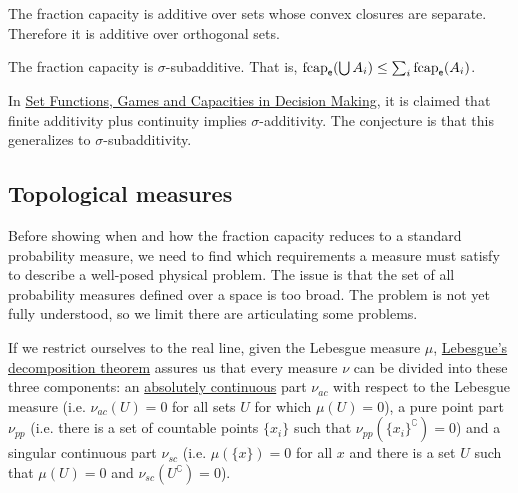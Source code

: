 \begin{conj}
	The fraction capacity is additive over sets whose convex closures are separate. Therefore it is additive over orthogonal sets.
\end{conj}

\begin{conj}
	The fraction capacity is $\sigma$-subadditive. That is, $\mathrm{fcap}_{\mathsf{e}}(\bigcup A_i) \leq \sum_i \mathrm{fcap}_{\mathsf{e}}(A_i)$.
\end{conj}

\begin{remark}
	In \href{https://link.springer.com/book/10.1007/978-3-319-30690-2}{Set Functions, Games and Capacities in Decision Making}, it is claimed that finite additivity plus continuity implies $\sigma$-additivity. The conjecture is that this generalizes to $\sigma$-subadditivity.
\end{remark}

\subsection{Topological measures}

Before showing when and how the fraction capacity reduces to a standard probability measure, we need to find which requirements a measure must satisfy to describe a well-posed physical problem. The issue is that the set of all probability measures defined over a space is too broad. The problem is not yet fully understood, so we limit there are articulating some problems.

If we restrict ourselves to the real line, given the Lebesgue measure $\mu$, \href{https://en.wikipedia.org/wiki/Lebesgue%27s_decomposition_theorem}{Lebesgue's decomposition theorem} assures us that every measure $\nu$ can be divided into these three components: an \href{https://en.wikipedia.org/wiki/Absolute_continuity#Absolute_continuity_of_measures}{absolutely continuous} part $\nu_{ac}$ with respect to the Lebesgue measure (i.e. $\nu_{ac}(U)=0$ for all sets $U$ for which $\mu(U)=0$), a pure point part $\nu_{pp}$ (i.e. there is a set of countable points $\{x_i\}$ such that $\nu_{pp}(\{x_i\}^{\complement})=0$) and a singular continuous part $\nu_{sc}$ (i.e. $\mu(\{x\})=0$ for all $x$ and there is a set $U$ such that $\mu(U)=0$ and $\nu_{sc}(U^{\complement})=0$).

